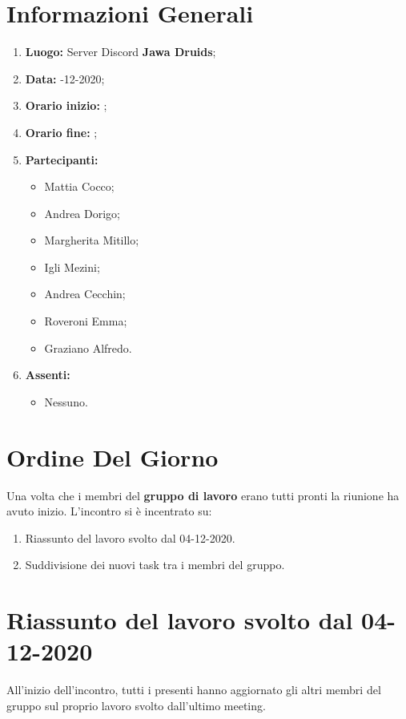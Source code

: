 \newpage
	\section{Informazioni Generali}
	\begin{enumerate}
		\item \textbf{Luogo:} \normalfont Server Discord \textbf{Jawa Druids};
		\item \textbf{Data:} -12-2020;
		\item \textbf{Orario inizio:} ;
		\item \textbf{Orario fine:} ;
		\item \textbf{Partecipanti:}
		\begin{itemize}
			\item Mattia Cocco; 
			\item Andrea Dorigo;
			\item Margherita Mitillo;
			\item Igli Mezini;
			\item Andrea Cecchin;
			\item Roveroni Emma;
			\item Graziano Alfredo.
		\end{itemize}
		\item \textbf{Assenti:}
		\begin{itemize}
			\item Nessuno.
		\end{itemize}
	\end{enumerate}
	\section{Ordine Del Giorno}
	Una volta che i membri del \textbf{gruppo di lavoro} erano tutti pronti la riunione ha avuto inizio.
	L'incontro si è incentrato su:
	\begin{enumerate}
		\item Riassunto del lavoro svolto dal 04-12-2020.
		
		\item Suddivisione dei nuovi task tra i membri del gruppo.
		
	\end{enumerate}

	\section{Riassunto del lavoro svolto dal 04-12-2020}
	All'inizio dell'incontro, tutti i presenti hanno aggiornato gli altri membri del gruppo sul proprio lavoro svolto dall'ultimo meeting.
	
